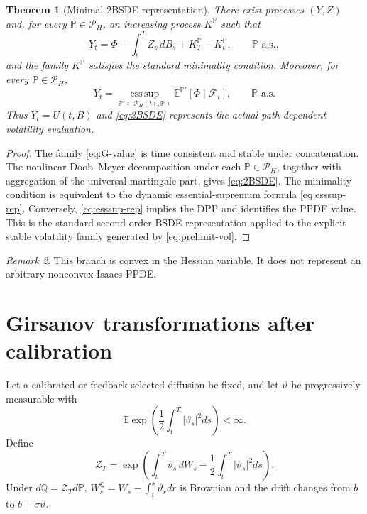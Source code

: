 \documentclass[11pt,reqno]{amsart}
\newtheorem{theorem}{Theorem}[section]
\theoremstyle{definition}
\theoremstyle{remark}
\newtheorem{remark}[theorem]{Remark}
\newcommand{\E}{\mathbb E}
\newcommand{\Pp}{\mathbb P}
\newcommand{\Qp}{\mathbb Q}
\newcommand{\cP}{\mathcal P}
\newcommand{\esssup}{\operatorname*{ess\,sup}}
\newcommand{\abs}[1]{\left\lvert #1\right\rvert}
\begin{document}
\begin{theorem}[Minimal 2BSDE representation]\label{thm:2BSDE}
There exist processes $(Y,Z)$ and, for every $\Pp\in\cP_H$, an increasing
process $K^\Pp$ such that
\begin{equation}\label{eq:2BSDE}
 Y_t=\Phi-
 \int_t^TZ_s\,dB_s+K_T^\Pp-K_t^\Pp,
 \qquad \Pp\text{-a.s.},
\end{equation}
and the family $K^\Pp$ satisfies the standard minimality condition.  Moreover,
for every $\Pp\in\cP_H$,
\begin{equation}\label{eq:esssup-rep}
 Y_t=\esssup_{\Pp'\in\cP_H(t+,\Pp)}
 \E^{\Pp'}[\Phi\mid\mathcal F_t],
 \qquad \Pp\text{-a.s.}
\end{equation}
Thus $Y_t=U(t,B)$ and \eqref{eq:2BSDE} represents the actual path-dependent
volatility evaluation.
\end{theorem}

\begin{proof}
The family \eqref{eq:G-value} is time consistent and stable under
concatenation.  The nonlinear Doob--Meyer decomposition under each
$\Pp\in\cP_H$, together with aggregation of the universal martingale part,
gives \eqref{eq:2BSDE}.  The minimality condition is equivalent to the dynamic
essential-supremum formula \eqref{eq:esssup-rep}.  Conversely,
\eqref{eq:esssup-rep} implies the DPP and identifies the PPDE value.  This is
the standard second-order BSDE representation applied to the explicit stable
volatility family generated by \eqref{eq:prelimit-vol}.
\end{proof}

\begin{remark}
This branch is convex in the Hessian variable.  It does not represent an
arbitrary nonconvex Isaacs PPDE.
\end{remark}

\section{Girsanov transformations after calibration}\label{sec:girsanov}

Let a calibrated or feedback-selected diffusion be fixed, and let $\vartheta$
be progressively measurable with
\begin{equation}\label{eq:Novikov}
 \E\exp\left(\frac12\int_t^T\abs{\vartheta_s}^2ds\right)<\infty.
\end{equation}
Define
\begin{equation}\label{eq:density}
 \mathcal Z_T=
 \exp\left(\int_t^T\vartheta_s\,dW_s
 -\frac12\int_t^T\abs{\vartheta_s}^2ds\right).
\end{equation}
Under $d\Qp=\mathcal Z_Td\Pp$,
$W_s^\Qp=W_s-\int_t^s\vartheta_rdr$ is Brownian and the drift changes from
$b$ to $b+\sigma\vartheta$.
\end{document}
